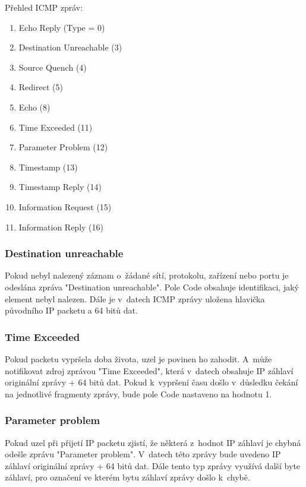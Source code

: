 \documentclass[12pt, a4paper]{article}
\begin{document}
Přehled ICMP zpráv:

\begin{enumerate}
\item Echo Reply (Type = 0)
\item Destination Unreachable (3)
\item Source Quench (4)
\item Redirect (5)
\item Echo (8)
\item Time Exceeded (11)
\item Parameter Problem (12)
\item Timestamp (13)
\item Timestamp Reply (14)
\item Information Request (15)
\item Information Reply (16)
\end{enumerate}

\subsubsection{Destination unreachable}

Pokud nebyl nalezený záznam o~žádané sítí, protokolu, zařízení nebo portu je odeslána zpráva "Destination unreachable". Pole Code obsahuje identifikaci, jaký element nebyl nalezen. Dále je v~datech ICMP zprávy uložena hlavička původního IP packetu a 64 bitů dat. 

\subsubsection{Time Exceeded}

Pokud packetu vypršela doba života, uzel je povinen ho zahodit. A~může notifikovat zdroj zprávou "Time Exceeded", která v~datech obsahuje IP záhlaví originální zprávy + 64 bitů dat. Pokud k~vypršení času došlo v~důsledku čekání na jednotlivé fragmenty zprávy, bude pole Code nastaveno na hodnotu 1.

\subsubsection{Parameter problem}

Pokud uzel při přijetí IP packetu zjistí, že některá z~hodnot IP záhlaví je chybná odešle zprávu "Parameter problem". V~datech této zprávy bude uvedeno IP záhlaví originální zprávy + 64 bitů dat. Dále tento typ zprávy využívá další byte záhlaví, pro označení ve kterém bytu záhlaví zprávy došlo k~chybě.
\end{document}
